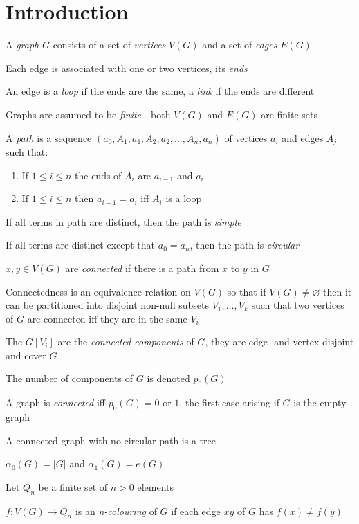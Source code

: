 \documentclass[a4paper]{article}
\begin{document}
\setlength{\parindent}{0pt}
\setlength{\parskip}{1em}

\section{Introduction}
A \textit{graph} $G$ consists of a set of \textit{vertices} $V(G)$ and a set of \textit{edges} $E(G)$ 

Each edge is associated with one or two vertices, its \textit{ends}

An edge is a \textit{loop} if the ends are the same, a \textit{link} if the ends are different

Graphs are assumed to be \textit{finite} - both $V(G)$ and $E(G)$ are finite sets

A \textit{path} is a sequence $(a_0, A_1, a_1, A_2, a_2, \ldots, A_n, a_n)$ of vertices $a_i$ and edges $A_j$ such that:
\begin{enumerate}
\item If $1 \leq i \leq n$ the ends of $A_i$ are $a_{i-1}$ and $a_i$
\item If $1 \leq i \leq n$ then $a_{i-1} = a_i$ iff $A_i$ is a loop
\end{enumerate}

If all terms in path are distinct, then the path is \textit{simple}

If all terms are distinct except that $a_0 = a_n$, then the path is \textit{circular}

$x,y \in V(G)$ are \textit{connected} if there is a path from $x$ to $y$ in $G$

Connectedness is an equivalence relation on $V(G)$ so that if $V(G) \neq \varnothing$ then it can be partitioned into disjoint non-null subsets $V_1, \ldots, V_k$ such that two vertices of $G$ are connected iff they are in the same $V_i$

The $G[V_i]$ are the \textit{connected components} of $G$, they are edge- and vertex-disjoint and cover $G$

The number of components of $G$ is denoted $p_0(G)$

A graph is \textit{connected} iff $p_0(G) = 0$ or $1$, the first case arising if $G$ is the empty graph

A connected graph with no circular path is a tree

$\alpha_0(G) = |G|$ and $\alpha_1(G) = e(G)$

Let $Q_n$ be a finite set of $n > 0$ elements

$f:V(G) \to Q_n$ is an \textit{n-colouring} of $G$ if each edge $xy$ of $G$ has $f(x) \neq f(y)$
\end{document}

